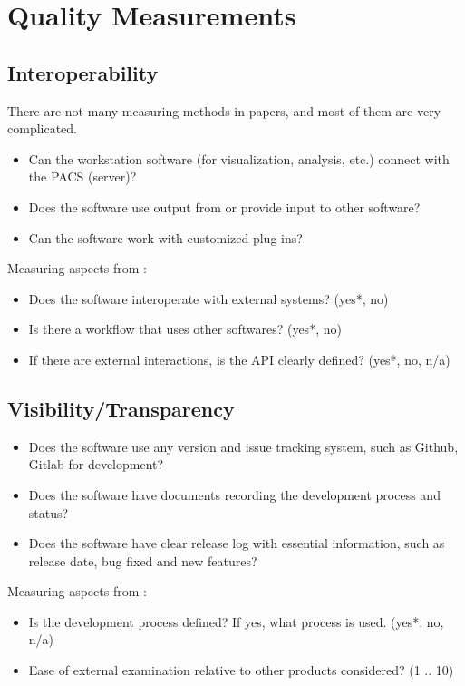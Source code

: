 \documentclass{article}
\begin{document}
\newpage

\section{Quality Measurements}

\subsection{Interoperability}
There are not many measuring methods in papers, and most of them are very
complicated.
\begin{itemize}
\item Can the workstation software (for visualization, analysis, etc.) connect
with the PACS (server)?
    \item Does the software use output from or provide input to other software?
    \item Can the software work with customized plug-ins? 
\end{itemize}

\noindent Measuring aspects from \citep{SmithEtAl2018}:
\begin{itemize}
    \item Does the software interoperate with external systems? ({yes*, no})
    \item Is there a workflow that uses other softwares? ({yes*, no})
\item If there are external interactions, is the API clearly defined? ({yes*,
no, n/a})
\end{itemize}

\subsection{Visibility/Transparency}
\begin{itemize}
\item Does the software use any version and issue tracking system, such as
Github, Gitlab for development?
\item Does the software have documents recording the development process and
status?
\item Does the software have clear release log with essential information, such
as release date, bug fixed and new features?
\end{itemize}

\noindent Measuring aspects from \citep{SmithEtAl2018}:
\begin{itemize}
\item Is the development process defined? If yes, what process is used. ({yes*,
no, n/a})
\item Ease of external examination relative to other products considered? ({1 ..
10})
\end{itemize}
\end{document}
